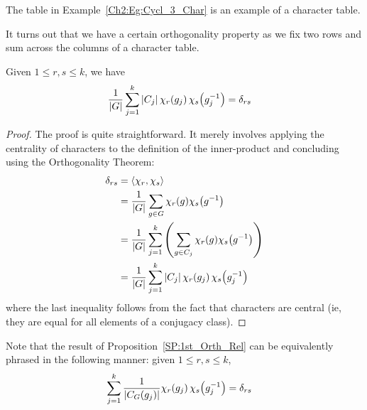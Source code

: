 The table in Example~\ref{Ch2:Eg:Cycl_3_Char} is an example of a character table.

It turns out that we have a certain orthogonality property as we fix two rows and sum across the columns of a character table.

\begin{boxproposition}\label{SP:1st_Orth_Rel}
    Given $1 \leq r, s \leq k$, we have
    \begin{align*}
        \frac{1}{\left\lvert G \right\rvert} \sum_{j=1}^{k} \left\lvert C_j \right\rvert \chi_r\!\left( g_j \right) \chi_s\!\left( g_j^{-1} \right) &= \delta_{rs}
    \end{align*}
\end{boxproposition}
\begin{proof}
    The proof is quite straightforward. It merely involves applying the centrality of characters to the definition of the inner-product and concluding using the Orthogonality Theorem:
    \begin{align*}
        \delta_{rs} &=
        \left\langle \chi_r, \chi_s \right\rangle \\
        &= \frac{1}{\left\lvert G \right\rvert} \sum_{g \in G} \chi_r(g) \chi_s\!\left( g^{-1} \right) \\
        &= \frac{1}{\left\lvert G \right\rvert} \sum_{j=1}^{k} \left( \sum_{g \in C_j} \chi_r(g) \chi_s\!\left( g^{-1} \right) \right) \\
        &= \frac{1}{\left\lvert G \right\rvert} \sum_{j=1}^{k} \left\lvert C_j \right\rvert \chi_r\!\left( g_j \right) \chi_s\!\left( g_j^{-1} \right)
    \end{align*}
    where the last inequality follows from the fact that characters are central (ie, they are equal for all elements of a conjugacy class).
\end{proof}
\begin{remark}
    Note that the result of Proposition~\ref{SP:1st_Orth_Rel} can be equivalently phrased in the following manner: given $1 \leq r, s \leq k$,
    \begin{align}
        \sum_{j=1}^{k} \frac{1}{\left\lvert C_G(g_j) \right\rvert} \chi_r\!\left( g_j \right) \chi_s\!\left( g_j^{-1} \right) &= \delta_{rs}
        \label{SP:Eq:1st_Orth_Rel_Conj_Cl}
    \end{align}
\end{remark}

